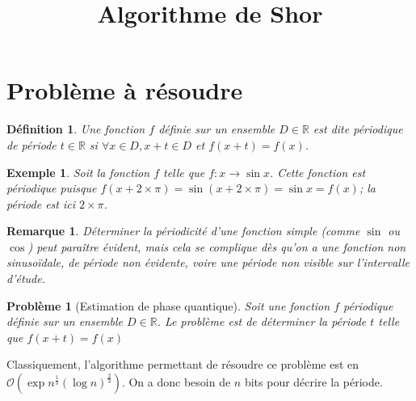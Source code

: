 \documentclass[12pt,a4paper]{article}
\title{Algorithme de Shor}
\date{}
\newtheorem{definition}{Définition}
\newtheorem{pb}{Problème}
\newtheorem{rem}{Remarque}
\newtheorem{ex}{Exemple}
\begin{document}
\maketitle

\section{Problème à résoudre}

\begin{definition}
  Une fonction $f$ définie sur un ensemble $ D \in \mathbb{R}$ est dite périodique de période $t \in \mathbb{R}$ si $\forall x \in D, x+t \in D $ et $f(x+t) = f(x)$.
\end{definition}

\begin{ex}
  Soit la fonction $f$ telle que $f : x \to \sin{x}$. Cette fonction est périodique puisque $f(x + 2 \times \pi) = \sin{(x + 2 \times \pi)} = \sin{x} = f(x)$; la période est ici $2 \times \pi$.


\end{ex}

\begin{rem}
  Déterminer la périodicité d'une fonction simple (comme $\sin$ ou $\cos$) peut paraître évident, mais cela se complique dès qu'on a une fonction non sinusoïdale, de période non évidente, voire une période non visible sur l'intervalle d'étude.
\end{rem}

\begin{pb}[Estimation de phase quantique]
  Soit une fonction $f$ périodique définie sur un ensemble $ D \in \mathbb{R}$. Le problème est de déterminer la période $t$ telle que $f(x+t)=f(x)$
\end{pb}

Classiquement, l'algorithme permettant de résoudre ce problème est en $\mathcal{O}(\exp{n^{\frac{1}{3}} (\log{n})^{\frac{2}{3}}  })$. On a donc besoin de $n$ bits pour décrire la période.
\end{document}
